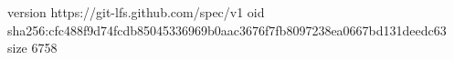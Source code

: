 version https://git-lfs.github.com/spec/v1
oid sha256:cfc488f9d74fcdb85045336969b0aac3676f7fb8097238ea0667bd131deedc63
size 6758
